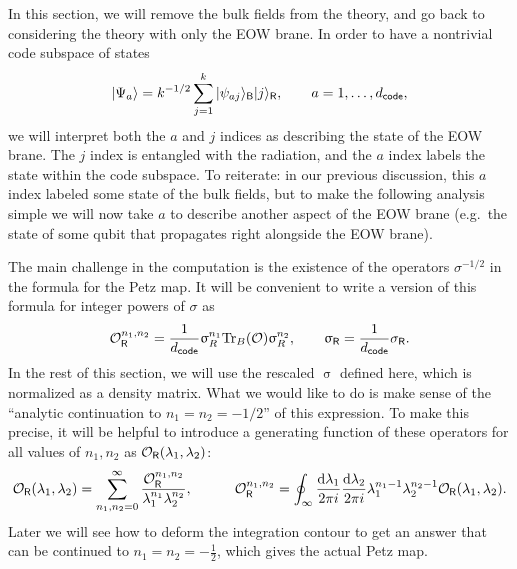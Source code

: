 \documentclass[12pt]{article}
\newcommand{\be}{\begin{equation}}
\newcommand{\ee}{\end{equation}}
\numberwithin{equation}{section}
\def\tr{\text{Tr}}
\begin{document}
In this section, we will remove the bulk fields from the theory, and go back to considering the theory with only the EOW brane. In order to have a nontrivial code subspace of states
\be
|\Psi_a\rangle = k^{-1/2}\sum_{j = 1}^k|\psi_{aj}\rangle_{\sf{B}}|j\rangle_{\sf{R}}, \hspace{20pt} a = 1,\dots,d_{\sf{code}},
\ee
we will interpret both the $a$ and $j$ indices as describing the state of the EOW brane. The $j$ index is entangled with the radiation, and the $a$ index labels the state within the code subspace. To reiterate: in our previous discussion, this $a$ index labeled some state of the bulk fields, but to make the following analysis simple we will now take $a$ to describe another aspect of the EOW brane (e.g.~the state of some qubit that propagates right alongside the EOW brane).


The main challenge in the computation is the existence of the operators $\sigma^{-1/2}$ in the formula for the Petz map. It will be convenient to write a version of this formula for integer powers of $\sigma$ as
\be
\mathcal{O}_{\sf{R}}^{n_1,n_2}=\frac{1}{d_{\sf{code}}}\upsigma_R^{n_1}\tr_B (\mathcal{O}) \upsigma_R^{n_2}, \hspace{20pt} \upsigma_{\sf{R}} = \frac{1}{d_{\sf{code}}}\sigma_{\sf{R}}.
\ee
In the rest of this section, we will use the rescaled $\upsigma$ defined here, which is normalized as a density matrix. What we would like to do is make sense of the ``analytic continuation to $n_1 = n_2 = -1/2$'' of this expression. To make this precise, it will be helpful to introduce a generating function of these operators for all values of $n_1,n_2$ as $\mathcal{O}_{\sf{R}}(\lambda_1,\lambda_2)$:
\be
\mathcal{O}_{\sf{R}}(\lambda_1,\lambda_2)=\sum_{n_1,n_2 = 0}^\infty \frac{\mathcal{O}_{\sf{R}}^{n_1,n_2}}{\lambda_1^{n_1}\lambda_2^{n_2}}, \hspace{30pt} \mathcal{O}_{\sf{R}}^{n_1,n_2} = \oint_{\infty} \frac{\mathrm{d}\lambda_1}{2\pi i}\frac{\mathrm{d}\lambda_2}{2\pi i}\lambda_1^{n_1-1}\lambda_2^{n_2-1}\mathcal{O}_{\sf{R}}(\lambda_1,\lambda_2).\label{transform}
\ee
Later we will see how to deform the integration contour to get an answer that can be continued to $n_1 = n_2 = -\frac{1}{2}$, which gives the actual Petz map.
\end{document}
